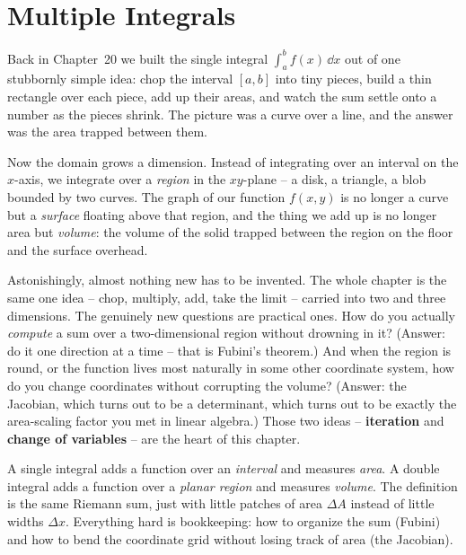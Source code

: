 \chapter{Multiple Integrals}

Back in Chapter~20 we built the single integral $\int_a^b f(x)\,\dd x$ out of one
stubbornly simple idea: chop the interval $[a,b]$ into tiny pieces, build a thin
rectangle over each piece, add up their areas, and watch the sum settle onto a
number as the pieces shrink. The picture was a curve over a line, and the answer
was the area trapped between them.

Now the domain grows a dimension. Instead of integrating over an interval on the
$x$-axis, we integrate over a \emph{region} in the $xy$-plane -- a disk, a
triangle, a blob bounded by two curves. The graph of our function $f(x,y)$ is no
longer a curve but a \emph{surface} floating above that region, and the thing we
add up is no longer area but \emph{volume}: the volume of the solid trapped
between the region on the floor and the surface overhead.

Astonishingly, almost nothing new has to be invented. The whole chapter is the
same one idea -- chop, multiply, add, take the limit -- carried into two and
three dimensions. The genuinely new questions are practical ones. How do you
actually \emph{compute} a sum over a two-dimensional region without drowning in
it? (Answer: do it one direction at a time -- that is Fubini's theorem.) And
when the region is round, or the function lives most naturally in some other
coordinate system, how do you change coordinates without corrupting the volume?
(Answer: the Jacobian, which turns out to be a determinant, which turns out to be
exactly the area-scaling factor you met in linear algebra.) Those two ideas --
\textbf{iteration} and \textbf{change of variables} -- are the heart of this
chapter.

\begin{focusbox}
A single integral adds a function over an \emph{interval} and measures
\emph{area}. A double integral adds a function over a \emph{planar region} and
measures \emph{volume}. The definition is the same Riemann sum, just with little
patches of area $\Delta A$ instead of little widths $\Delta x$. Everything hard
is bookkeeping: how to organize the sum (Fubini) and how to bend the coordinate
grid without losing track of area (the Jacobian).
\end{focusbox}

\chapterline

